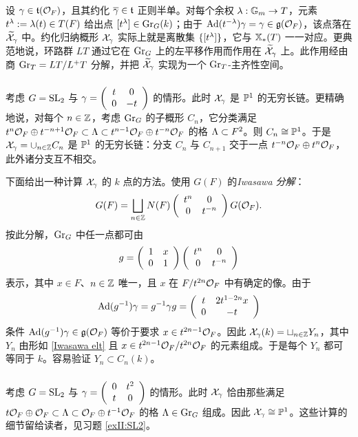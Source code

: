 \subsubsection{}\label{sss:reduction rs} 设 $\gamma\in\mathfrak{t}(\mathcal{O}_{F})$，且其约化 $\overline\gamma\in\mathfrak{t}$ 正则半单。对每个余权 $\lambda:\mathbb{G}_m\to T$，元素 $t^{\lambda}:=\lambda(t)\in T(F)$ 给出点 $[t^{\lambda}]\in \textup{Gr}_{G}(k)$；由于 $\textup{Ad}(t^{-\lambda})\gamma=\gamma\in \mathfrak{g}(\mathcal{O}_{F})$，该点落在 $\widetilde{\mathcal{X}}_{\gamma}$ 中。约化归纳概形 $\mathcal{X}_{\gamma}$ 实际上就是离散集 $\{[t^{\lambda}]\}$，它与 $\mathbb{X}_*(T)$ 一一对应。更典范地说，环路群 $LT$ 通过它在 $\textup{Gr}_{G}$ 上的左平移作用而作用在 $\widetilde{\mathcal{X}}_{\gamma}$ 上。此作用经由商 $\textup{Gr}_{T}=LT/L^{+}T$ 分解，并把 $\widetilde{\mathcal{X}}_{\gamma}$ 实现为一个 $\textup{Gr}_{T}$-主齐性空间。

\subsubsection{}\label{P1 chain} 考虑 $G=\textup{SL}_{2}$ 与 $\gamma=\left(\begin{array}{cc} t & 0 \\ 0 & -t \end{array}\right)$ 的情形。此时 $\mathcal{X}_{\gamma}$ 是 $\mathbb{P}^{1}$ 的无穷长链。更精确地说，对每个 $n\in\mathbb{Z}$，考虑 $\textup{Gr}_{G}$ 的子概形 $C_{n}$，它分类满足 $t^{n}\mathcal{O}_{F}\oplus t^{-n+1}\mathcal{O}_{F} \subset \Lambda\subset t^{n-1}\mathcal{O}_{F}\oplus t^{-n}\mathcal{O}_{F}$ 的格 $\Lambda\subset F^{2}$。则 $C_{n}\cong\mathbb{P}^{1}$。于是 $\mathcal{X}_{\gamma}=\cup_{n\in\mathbb{Z}}C_{n}$ 是 $\mathbb{P}^{1}$ 的无穷长链：分支 $C_{n}$ 与 $C_{n+1}$ 交于一点 $t^{-n}\mathcal{O}_{F}\oplus t^{n}\mathcal{O}_{F}$，此外诸分支互不相交。

下面给出一种计算 $\mathcal{X}_{\gamma}$ 的 $k$ 点的方法。使用 $G(F)$ 的{\em Iwasawa 分解}：
\begin{equation*}
G(F)=\bigsqcup_{n\in\mathbb{Z}}N(F)\left(\begin{array}{cc} t^{n} & 0 \\ 0 & t^{-n} \end{array}\right)G(\mathcal{O}_{F}).
\end{equation*}
按此分解，$\textup{Gr}_{G}$ 中任一点都可由
\begin{equation}\label{Iwasawa elt}
g=\left(\begin{array}{cc} 1 & x \\ 0 & 1 \end{array}\right)\left(\begin{array}{cc} t^{n} & 0 \\ 0 & t^{-n} \end{array}\right)
\end{equation}
表示，其中 $x\in F$、$n\in\mathbb{Z}$ 唯一，且 $x$ 在 $F/t^{2n}\mathcal{O}_{F}$ 中有确定的像。由于
\begin{equation*}
\textup{Ad}(g^{-1})\gamma=g^{-1}\gamma g=\left(\begin{array}{cc} t & 2t^{1-2n}x \\ 0 & -t \end{array}\right)
\end{equation*}
条件 $\textup{Ad}(g^{-1})\gamma\in\mathfrak{g}(\mathcal{O}_{F})$ 等价于要求 $x\in t^{2n-1}\mathcal{O}_{F}$。因此 $\mathcal{X}_{\gamma}(k)=\sqcup_{n\in\mathbb{Z}}Y_{n}$，其中 $Y_{n}$ 由形如 \eqref{Iwasawa elt} 且 $x\in t^{2n-1}\mathcal{O}_{F}/t^{2n}\mathcal{O}_{F}$ 的元素组成。于是每个 $Y_{n}$ 都可等同于 $k$。容易验证 $Y_{n}\subset C_{n}(k)$。

\subsubsection{}\label{SL2 ram dim 1} 考虑 $G=\textup{SL}_{2}$ 与 $\gamma=\left(\begin{array}{cc} 0 & t^{2} \\ t & 0 \end{array}\right)$ 的情形。此时 $\mathcal{X}_{\gamma}$ 恰由那些满足 $t\mathcal{O}_{F}\oplus \mathcal{O}_{F}\subset\Lambda\subset\mathcal{O}_{F}\oplus t^{-1}\mathcal{O}_{F}$ 的格 $\Lambda\in\textup{Gr}_{G}$ 组成。因此 $\mathcal{X}_{\gamma}\cong\mathbb{P}^{1}$。这些计算的细节留给读者，见习题 \ref{exII:SL2}。

